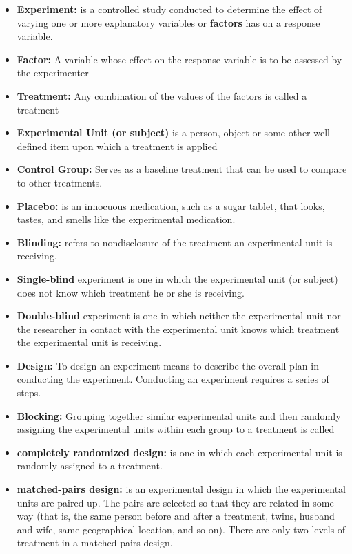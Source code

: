 \documentclass{report}
\begin{document}
        \begin{itemize}
            \item \textbf{Experiment:} is a controlled study conducted to determine the effect of varying one or more explanatory variables or \textbf{factors} has on a response variable. 
            \item \textbf{Factor:} A variable whose effect on the response variable is to be assessed by the experimenter
            \item \textbf{Treatment:} Any combination of the values of the factors is called a treatment
            \item \textbf{Experimental Unit (or subject)} is a person, object or some other well-defined item upon which a treatment is applied
            \item \textbf{Control Group:} Serves as a baseline treatment that can be used to compare to other treatments.
            \item \textbf{Placebo:} is an innocuous medication, such as a sugar tablet, that looks, tastes, and smells like the experimental medication.
            \item \textbf{Blinding:} refers to nondisclosure of the treatment an experimental unit is receiving.
            \item \textbf{Single-blind} experiment is one in which the experimental unit (or subject) does not know which treatment he or she is receiving.
            \item \textbf{Double-blind} experiment is one in which neither the experimental unit nor the researcher in contact with the experimental unit knows which treatment the experimental unit is receiving.
            \item \textbf{Design:} To design an experiment means to describe the overall plan in conducting the experiment. Conducting an experiment requires a series of steps.
            \item \textbf{Blocking:} Grouping together similar experimental units and then randomly assigning the experimental units within each group to a treatment is called 
            \item \textbf{completely randomized design:} is one in which each experimental unit is randomly assigned to a treatment.
            \item \textbf{matched-pairs design:} is an experimental design in which the experimental units are paired up. The pairs are selected so that they are related in some way (that is, the same person before and after a treatment, twins, husband and wife, same geographical location, and so on). There are only two levels of treatment in a matched-pairs design.
        \end{itemize}
\end{document}
